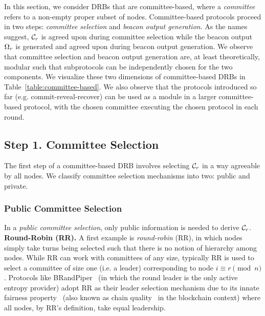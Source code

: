 In this section, we consider DRBs that are committee-based, where a \emph{committee} refers to a non-empty proper subset of nodes. Committee-based protocols proceed in two steps: \textit{committee selection} and \textit{beacon output generation}. As the names suggest, $\mathcal{C}_r$ is agreed upon during committee selection while the beacon output $\Omega_r$ is generated and agreed upon during beacon output generation.
We observe that committee selection and beacon output generation are, at least theoretically, modular such that subprotocols can be independently chosen for the two components. We visualize these two dimensions of committee-based DRBs in Table~\ref{table:committee-based}. We also observe that the protocols introduced so far (e.g. commit-reveal-recover) can be used as a module in a larger committee-based protocol, with the chosen committee executing the chosen protocol in each round.

\subsection{Step 1. Committee Selection}
The first step of a committee-based DRB involves selecting $\mathcal{C}_r$ in a way agreeable by all nodes. We classify committee selection mechanisms into two: public and private.

\subsubsection{Public Committee Selection}
\label{subsubsection:public-committee-selection}
In a \textit{public committee selection}, only public information is needed to derive $\mathcal{C}_r$.\\

\noindent\textbf{Round-Robin (RR).} A first example is \textit{round-robin} (RR), in which nodes simply take turns being selected such that there is no notion of hierarchy among nodes. While RR can work with committees of any size, typically RR is used to select a committee of size one (i.e. a leader) corresponding to node $i \equiv r \pmod n$. Protocols like BRandPiper~\cite{bhat2020randpiper} (in which the round leader is the only active entropy provider) adopt RR as their leader selection mechanism due to its innate fairness property~\cite{azouvi2018winning} (also known as chain quality~\cite{garay2015bitcoin} in the blockchain context) where all nodes, by RR's definition, take equal leadership.\\


